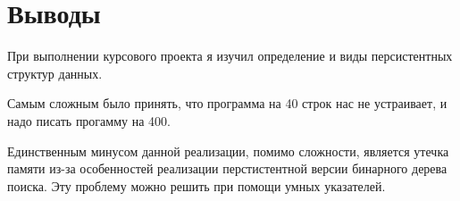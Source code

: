 \section{Выводы}
При выполнении курсового проекта я изучил определение и виды персистентных структур данных.

Самым сложным было принять, что программа на 40 строк нас не устраивает, и надо писать прогамму на 400.

Единственным минусом данной реализации, помимо сложности, является утечка памяти из-за особенностей реализации перстистентной версии бинарного дерева поиска. Эту проблему можно решить при помощи умных указателей.
\pagebreak
